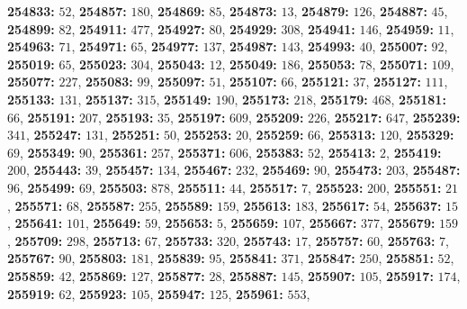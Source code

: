 \textsf{\bfseries 254833:} $52$, \textsf{\bfseries 254857:} $180$, \textsf{\bfseries 254869:} $85$, \textsf{\bfseries 254873:} $13$, \textsf{\bfseries 254879:} $126$, \textsf{\bfseries 254887:} $45$, \textsf{\bfseries 254899:} $82$, \textsf{\bfseries 254911:} $477$, \textsf{\bfseries 254927:} $80$, \textsf{\bfseries 254929:} $308$, \textsf{\bfseries 254941:} $146$, \textsf{\bfseries 254959:} $11$, \textsf{\bfseries 254963:} $71$, \textsf{\bfseries 254971:} $65$, \textsf{\bfseries 254977:} $137$, \textsf{\bfseries 254987:} $143$, \textsf{\bfseries 254993:} $40$, \textsf{\bfseries 255007:} $92$, \textsf{\bfseries 255019:} $65$, \textsf{\bfseries 255023:} $304$, \textsf{\bfseries 255043:} $12$, \textsf{\bfseries 255049:} $186$, \textsf{\bfseries 255053:} $78$, \textsf{\bfseries 255071:} $109$, \textsf{\bfseries 255077:} $227$, \textsf{\bfseries 255083:} $99$, \textsf{\bfseries 255097:} $51$, \textsf{\bfseries 255107:} $66$, \textsf{\bfseries 255121:} $37$, \textsf{\bfseries 255127:} $111$, \textsf{\bfseries 255133:} $131$, \textsf{\bfseries 255137:} $315$, \textsf{\bfseries 255149:} $190$, \textsf{\bfseries 255173:} $218$, \textsf{\bfseries 255179:} $468$, \textsf{\bfseries 255181:} $66$, \textsf{\bfseries 255191:} $207$, \textsf{\bfseries 255193:} $35$, \textsf{\bfseries 255197:} $609$, \textsf{\bfseries 255209:} $226$, \textsf{\bfseries 255217:} $647$, \textsf{\bfseries 255239:} $341$, \textsf{\bfseries 255247:} $131$, \textsf{\bfseries 255251:} $50$, \textsf{\bfseries 255253:} $20$, \textsf{\bfseries 255259:} $66$, \textsf{\bfseries 255313:} $120$, \textsf{\bfseries 255329:} $69$, \textsf{\bfseries 255349:} $90$, \textsf{\bfseries 255361:} $257$, \textsf{\bfseries 255371:} $606$, \textsf{\bfseries 255383:} $52$, \textsf{\bfseries 255413:} $2$, \textsf{\bfseries 255419:} $200$, \textsf{\bfseries 255443:} $39$, \textsf{\bfseries 255457:} $134$, \textsf{\bfseries 255467:} $232$, \textsf{\bfseries 255469:} $90$, \textsf{\bfseries 255473:} $203$, \textsf{\bfseries 255487:} $96$, \textsf{\bfseries 255499:} $69$, \textsf{\bfseries 255503:} $878$, \textsf{\bfseries 255511:} $44$, \textsf{\bfseries 255517:} $7$, \textsf{\bfseries 255523:} $200$, \textsf{\bfseries 255551:} $21$, \textsf{\bfseries 255571:} $68$, \textsf{\bfseries 255587:} $255$, \textsf{\bfseries 255589:} $159$, \textsf{\bfseries 255613:} $183$, \textsf{\bfseries 255617:} $54$, \textsf{\bfseries 255637:} $15$, \textsf{\bfseries 255641:} $101$, \textsf{\bfseries 255649:} $59$, \textsf{\bfseries 255653:} $5$, \textsf{\bfseries 255659:} $107$, \textsf{\bfseries 255667:} $377$, \textsf{\bfseries 255679:} $159$, \textsf{\bfseries 255709:} $298$, \textsf{\bfseries 255713:} $67$, \textsf{\bfseries 255733:} $320$, \textsf{\bfseries 255743:} $17$, \textsf{\bfseries 255757:} $60$, \textsf{\bfseries 255763:} $7$, \textsf{\bfseries 255767:} $90$, \textsf{\bfseries 255803:} $181$, \textsf{\bfseries 255839:} $95$, \textsf{\bfseries 255841:} $371$, \textsf{\bfseries 255847:} $250$, \textsf{\bfseries 255851:} $52$, \textsf{\bfseries 255859:} $42$, \textsf{\bfseries 255869:} $127$, \textsf{\bfseries 255877:} $28$, \textsf{\bfseries 255887:} $145$, \textsf{\bfseries 255907:} $105$, \textsf{\bfseries 255917:} $174$, \textsf{\bfseries 255919:} $62$, \textsf{\bfseries 255923:} $105$, \textsf{\bfseries 255947:} $125$, \textsf{\bfseries 255961:} $553$, 
